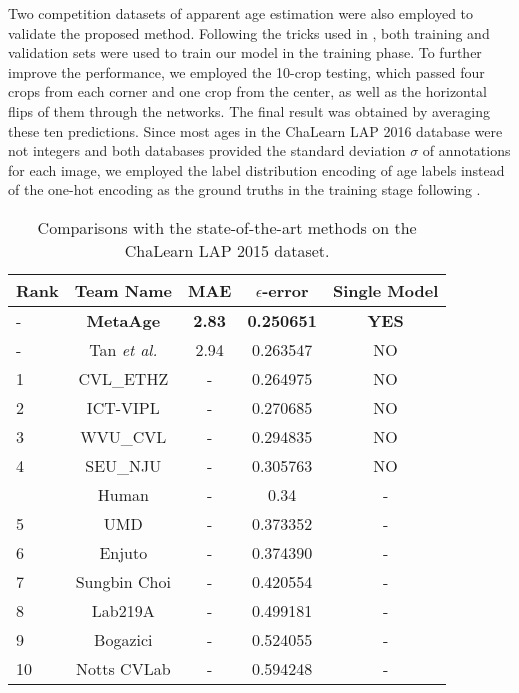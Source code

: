 \documentclass[journal,twoside]{IEEEtran}
\begin{document}
Two competition datasets of apparent age estimation were also employed to validate the proposed method. Following the tricks used in \cite{rothe2018deep,tan2017efficient,li2019bridgenet}, both training and validation sets were used to train our model in the training phase. To further improve the performance, we employed the 10-crop testing, which passed four crops from each corner and one crop from the center, as well as the horizontal flips of them through the networks. The final result was obtained by averaging these ten predictions. Since most ages in the ChaLearn LAP 2016 database were not integers and both databases provided the standard deviation $\sigma$ of annotations for each image, we employed the label distribution encoding of age labels instead of the one-hot encoding as the ground truths in the training stage following \cite{antipov2016apparent,liu2015agenet}.

\begin{table}[t]
\caption{Comparisons with the state-of-the-art methods on the ChaLearn LAP 2015 dataset.}
\label{table:rescha15}
\centering
\begin{tabular}{lcccc}
\toprule
Rank & Team Name & MAE & $\epsilon$-error & Single Model \\
\midrule
- & \textbf{MetaAge}  & \textbf{2.83} &  \textbf{0.250651} & \textbf{YES} \\
- & Tan \emph{et al.} \cite{tan2017efficient} & 2.94 & 0.263547 & NO \\
\midrule
1 & CVL\_ETHZ \cite{rothe2018deep}  & - & 0.264975   & NO \\
2 & ICT-VIPL \cite{liu2015agenet}  & - & 0.270685 & NO \\
3 & WVU\_CVL \cite{zhu2015study}   & - & 0.294835 &  NO  \\
4 & SEU\_NJU \cite{yang2015deep}  & - &  0.305763 & NO  \\
~ & Human & - & 0.34  & -  \\
5 & UMD &  - & 0.373352 & -  \\
6 & Enjuto  & - & 0.374390 & -\\
7 & Sungbin Choi & - & 0.420554 & - \\
8 & Lab219A & - & 0.499181 & -  \\
9 & Bogazici  & - & 0.524055 & - \\
10 & Notts CVLab & - & 0.594248 & -  \\
\bottomrule
\end{tabular}
\end{table}
\end{document}
